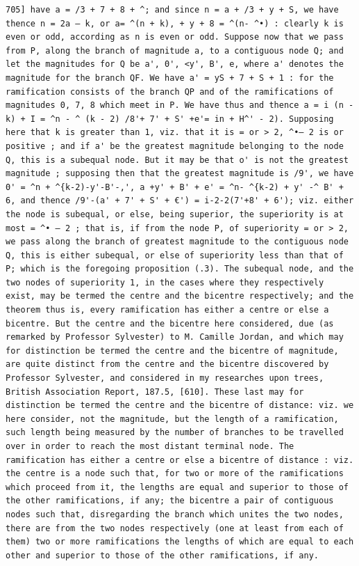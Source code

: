 \documentclass[11pt,a4paper]{book}
\begin{document}
\newpage
\setcounter{page}{599}
\begin{verbatim}
705] have a = /3 + 7 + 8 + ^; and since n = a + /3 + y + S, we have thence n = 2a — k, or a= ^(n + k), + y + 8 = ^(n- ^•) : clearly k is even or odd, according as n is even or odd. Suppose now that we pass from P, along the branch of magnitude a, to a contiguous node Q; and let the magnitudes for Q be a', 0', <y', B', e, where a' denotes the magnitude for the branch QF. We have a' = yS + 7 + S + 1 : for the ramification consists of the branch QP and of the ramifications of magnitudes 0, 7, 8 which meet in P. We have thus and thence a = i (n - k) + I = ^n - ^ (k - 2) /8'+ 7' + S' +e'= in + H^' - 2). Supposing here that k is greater than 1, viz. that it is = or > 2, ^•— 2 is or positive ; and if a' be the greatest magnitude belonging to the node Q, this is a subequal node. But it may be that o' is not the greatest magnitude ; supposing then that the greatest magnitude is /9', we have 0' = ^n + ^{k-2)-y'-B'-,', a +y' + B' + e' = ^n- ^{k-2) + y' -^ B' + 6, and thence /9'-(a' + 7' + S' + €') = i-2-2(7'+8' + 6'); viz. either the node is subequal, or else, being superior, the superiority is at most = ^• — 2 ; that is, if from the node P, of superiority = or > 2, we pass along the branch of greatest magnitude to the contiguous node Q, this is either subequal, or else of superiority less than that of P; which is the foregoing proposition (.3). The subequal node, and the two nodes of superiority 1, in the cases where they respectively exist, may be termed the centre and the bicentre respectively; and the theorem thus is, every ramification has either a centre or else a bicentre. But the centre and the bicentre here considered, due (as remarked by Professor Sylvester) to M. Camille Jordan, and which may for distinction be termed the centre and the bicentre of magnitude, are quite distinct from the centre and the bicentre discovered by Professor Sylvester, and considered in my researches upon trees, British Association Report, 187.5, [610]. These last may for distinction be termed the centre and the bicentre of distance: viz. we here consider, not the magnitude, but the length of a ramification, such length being measured by the number of branches to be travelled over in order to reach the most distant terminal node. The ramification has either a centre or else a bicentre of distance : viz. the centre is a node such that, for two or more of the ramifications which proceed from it, the lengths are equal and superior to those of the other ramifications, if any; the bicentre a pair of contiguous nodes such that, disregarding the branch which unites the two nodes, there are from the two nodes respectively (one at least from each of them) two or more ramifications the lengths of which are equal to each other and superior to those of the other ramifications, if any. 
\end{verbatim}
\end{document}
